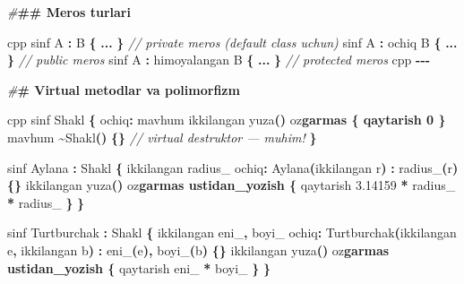 \documentclass[a4paper,11pt,twoside,openright]{book}
\newenvironment{Shaded}{\begin{snugshade}}{\end{snugshade}}
\newcommand{\CharTok}[1]{\textcolor[rgb]{0.31,0.60,0.02}{#1}}
\newcommand{\CommentTok}[1]{\textcolor[rgb]{0.56,0.35,0.01}{\textit{#1}}}
\newcommand{\ErrorTok}[1]{\textcolor[rgb]{0.64,0.00,0.00}{\textbf{#1}}}
\newcommand{\FloatTok}[1]{\textcolor[rgb]{0.00,0.00,0.81}{#1}}
\newcommand{\NormalTok}[1]{#1}
\newcommand{\OperatorTok}[1]{\textcolor[rgb]{0.81,0.36,0.00}{\textbf{#1}}}
\newcommand{\PreprocessorTok}[1]{\textcolor[rgb]{0.56,0.35,0.01}{\textit{#1}}}
\newcommand{\VariableTok}[1]{\textcolor[rgb]{0.00,0.00,0.00}{#1}}
\begin{document}
\begin{Shaded}
\begin{Highlighting}[]
\PreprocessorTok{\#}\ErrorTok{\#\# Meros turlari}

\ErrorTok{\textasciigrave{}\textasciigrave{}\textasciigrave{}}\NormalTok{cpp}
\NormalTok{sinf A }\OperatorTok{:}\NormalTok{ B }\OperatorTok{\{} \OperatorTok{...} \OperatorTok{\}}              \CommentTok{// private meros (default class uchun)}
\NormalTok{sinf A }\OperatorTok{:}\NormalTok{ ochiq B }\OperatorTok{\{} \OperatorTok{...} \OperatorTok{\}}        \CommentTok{// public meros}
\NormalTok{sinf A }\OperatorTok{:}\NormalTok{ himoyalangan B }\OperatorTok{\{} \OperatorTok{...} \OperatorTok{\}}  \CommentTok{// protected meros}
\ErrorTok{\textasciigrave{}\textasciigrave{}\textasciigrave{}}\NormalTok{cpp}
\OperatorTok{{-}{-}{-}}

\PreprocessorTok{\#}\ErrorTok{\# Virtual metodlar va polimorfizm}

\ErrorTok{\textasciigrave{}\textasciigrave{}\textasciigrave{}}\NormalTok{cpp}
\NormalTok{sinf Shakl }\OperatorTok{\{}
\NormalTok{ochiq}\OperatorTok{:}
\NormalTok{    mavhum ikkilangan yuza}\OperatorTok{()}\NormalTok{ o}\CharTok{\textquotesingle{}z}\ErrorTok{garmas \{ qaytarish 0 \}}
\NormalTok{    mavhum }\OperatorTok{\textasciitilde{}}\NormalTok{Shakl}\OperatorTok{()} \OperatorTok{\{\}}   \CommentTok{// virtual destruktor — muhim!}
\OperatorTok{\}}

\NormalTok{sinf Aylana }\OperatorTok{:}\NormalTok{ Shakl }\OperatorTok{\{}
\NormalTok{    ikkilangan }\VariableTok{radius\_}
\NormalTok{ochiq}\OperatorTok{:}
\NormalTok{    Aylana}\OperatorTok{(}\NormalTok{ikkilangan r}\OperatorTok{)} \OperatorTok{:} \VariableTok{radius\_}\OperatorTok{(}\NormalTok{r}\OperatorTok{)} \OperatorTok{\{\}}
\NormalTok{    ikkilangan yuza}\OperatorTok{()}\NormalTok{ o}\CharTok{\textquotesingle{}z}\ErrorTok{garmas ustidan\_yozish \{}
\NormalTok{        qaytarish }\FloatTok{3.14159} \OperatorTok{*} \VariableTok{radius\_} \OperatorTok{*} \VariableTok{radius\_}
    \OperatorTok{\}}
\OperatorTok{\}}

\NormalTok{sinf Turtburchak }\OperatorTok{:}\NormalTok{ Shakl }\OperatorTok{\{}
\NormalTok{    ikkilangan }\VariableTok{eni\_}\OperatorTok{,} \VariableTok{boyi\_}
\NormalTok{ochiq}\OperatorTok{:}
\NormalTok{    Turtburchak}\OperatorTok{(}\NormalTok{ikkilangan e}\OperatorTok{,}\NormalTok{ ikkilangan b}\OperatorTok{)} \OperatorTok{:} \VariableTok{eni\_}\OperatorTok{(}\NormalTok{e}\OperatorTok{),} \VariableTok{boyi\_}\OperatorTok{(}\NormalTok{b}\OperatorTok{)} \OperatorTok{\{\}}
\NormalTok{    ikkilangan yuza}\OperatorTok{()}\NormalTok{ o}\CharTok{\textquotesingle{}z}\ErrorTok{garmas ustidan\_yozish \{}
\NormalTok{        qaytarish }\VariableTok{eni\_} \OperatorTok{*} \VariableTok{boyi\_}
    \OperatorTok{\}}
\OperatorTok{\}}


\end{Highlighting}
\end{Shaded}
\end{document}
